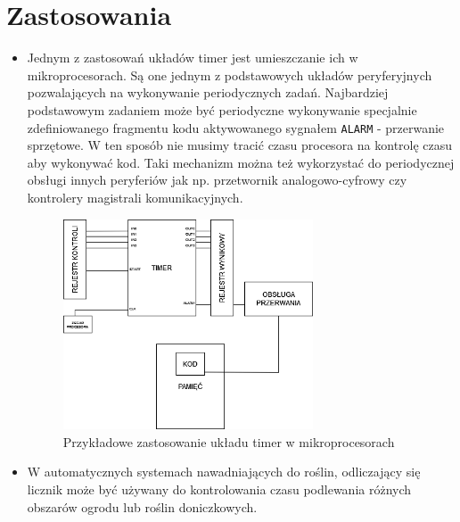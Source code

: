 \documentclass[a4paper]{article}
\begin{document}
\section{Zastosowania}
\begin{itemize}
    \item Jednym z zastosowań układów timer jest umieszczanie ich w mikroprocesorach. Są one jednym 
            z podstawowych układów peryferyjnych pozwalających na wykonywanie periodycznych 
            zadań. Najbardziej podstawowym zadaniem może być periodyczne wykonywanie specjalnie
            zdefiniowanego fragmentu kodu aktywowanego sygnałem \verb|ALARM| - przerwanie sprzętowe.
            W ten sposób nie musimy tracić czasu procesora na kontrolę czasu aby wykonywać kod. 
            Taki mechanizm można też wykorzystać do periodycznej obsługi innych peryferiów jak np.
            przetwornik analogowo-cyfrowy czy kontrolery magistrali komunikacyjnych.
    \begin{figure}[H]
        \centering
        \includegraphics[width=0.7\textwidth]{timer_use_mcu.png}
        \caption{Przykładowe zastosowanie układu timer w mikroprocesorach}
    \end{figure}

    \item W automatycznych systemach nawadniających do roślin,
    odliczający się licznik może być używany do kontrolowania czasu podlewania różnych obszarów ogrodu lub roślin doniczkowych.


\end{itemize}
\end{document}
